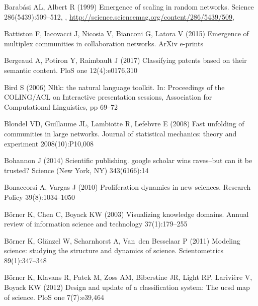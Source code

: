 \documentclass[10pt]{article}
\begin{document}
\begin{thebibliography}{84}
Barab{\'a}si AL, Albert R (1999) Emergence of scaling in random networks.
  Science 286(5439):509--512, ,
  \urlprefix\url{http://science.sciencemag.org/content/286/5439/509},

{Battiston} F, {Iacovacci} J, {Nicosia} V, {Bianconi} G, {Latora} V (2015)
  {Emergence of multiplex communities in collaboration networks}. ArXiv
  e-prints 

Bergeaud A, Potiron Y, Raimbault J (2017) Classifying patents based on their
  semantic content. PloS one 12(4):e0176,310

Bird S (2006) Nltk: the natural language toolkit. In: Proceedings of the
  COLING/ACL on Interactive presentation sessions, Association for
  Computational Linguistics, pp 69--72

Blondel VD, Guillaume JL, Lambiotte R, Lefebvre E (2008) Fast unfolding of
  communities in large networks. Journal of statistical mechanics: theory and
  experiment 2008(10):P10,008

Bohannon J (2014) Scientific publishing. google scholar wins raves--but can it
  be trusted? Science (New York, NY) 343(6166):14

Bonaccorsi A, Vargas J (2010) Proliferation dynamics in new sciences. Research
  Policy 39(8):1034--1050

B{\"o}rner K, Chen C, Boyack KW (2003) Visualizing knowledge domains. Annual
  review of information science and technology 37(1):179--255

B{\"o}rner K, Gl{\"a}nzel W, Scharnhorst A, Van~den Besselaar P (2011) Modeling
  science: studying the structure and dynamics of science. Scientometrics
  89(1):347--348

B{\"o}rner K, Klavans R, Patek M, Zoss AM, Biberstine JR, Light RP,
  Larivi{\`e}re V, Boyack KW (2012) Design and update of a classification
  system: The ucsd map of science. PloS one 7(7):e39,464


\end{thebibliography}
\end{document}
